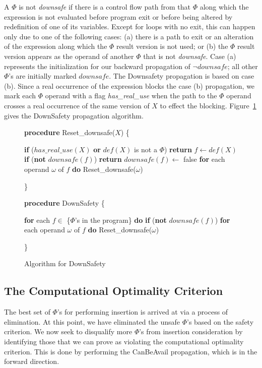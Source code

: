 A $\Phi$ is not \emph{downsafe} if there is a control flow path from that 
$\Phi$ along which the expression is not evaluated before program exit or 
before 
being altered by redefinition of one of its variables.  Except for loops with
no exit, this can happen only due to one of the following cases: (a) there
is a path to exit or an alteration of the expression
along which the $\Phi$ result version is not used; or (b) the $\Phi$ result
version appears as the operand of another $\Phi$ that is not \emph{downsafe}.
Case (a) represents the initialization for our backward propagation of 
$\neg downsafe$; all other $\Phi$'s are initially marked $downsafe$.
The Downsafety propagation is based on case (b).  Since a real occurrence of 
the expression blocks the case (b) propagation, we mark each
$\Phi$ operand with a flag \emph{has\_real\_use} when the path to the $\Phi$
operand crosses a real occurrence of the same version of $X$ to effect the
blocking.  Figure~\ref{fig: downsafety} gives the DownSafety propagation 
algorithm.

\begin{figure}[!ht]
{\bf procedure} Reset\_downsafe($X$) 
\{
\begin{code}
 {\bf if} ($has\_real\_use(X)$ {\bf or} $def(X)$ is not a $\Phi$)
   {\bf return}
 $f \leftarrow def(X)$
 {\bf if} ({\bf not} $downsafe(f)$)
   {\bf return}
 $downsafe(f) \leftarrow$ false
 {\bf for} each operand $\omega$ of $f$ {\bf do}
   Reset\_downsafe($\omega$)
\end{code}
\}

{\bf procedure} DownSafety
\{
\begin{code}
 {\bf for} each $f \in$ \{$\Phi$'s in the program\} {\bf do}
   {\bf if} ({\bf not} $downsafe(f)$)
     {\bf for} each operand $\omega$ of $f$ {\bf do}
	  Reset\_downsafe($\omega$)
\end{code}
\}
\caption{Algorithm for DownSafety}
\label{fig: downsafety}
\end{figure}

\subsection{The Computational Optimality Criterion}

The best set of $\Phi$'s for performing insertion is arrived at via a
process of elimination.  At this point, we have
eliminated the unsafe $\Phi$'s based on the safety criterion.  
We now seek to disqualify more $\Phi$'s from
insertion consideration by identifying those that we can prove as
violating the computational optimality criterion.  This is done
by performing the CanBeAvail propagation, which is in the forward direction.


